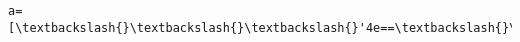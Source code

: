 \documentclass[11pt]{article}
\begin{document}
\begin{Verbatim}[commandchars=\\\{\}]
a=[\textbackslash{}\textbackslash{}\textbackslash{}'4e==\textbackslash{}\textbackslash{}\textbackslash{}',\textbackslash{}\textbackslash{}\textbackslash{}'4d\textbackslash{}\textbackslash{}\textbackslash{}',\textbackslash{}\textbackslash{}\textbackslash{}'4c=\textbackslash{}\textbackslash{}\textbackslash{}',\textbackslash{}\textbackslash{}\textbackslash{}'4b\textbackslash{}\textbackslash{}\textbackslash{}',\textbackslash{}\textbackslash{}\textbackslash{}'4a\textbackslash{}\textbackslash{}\textbackslash{}',\textbackslash{}\textbackslash{}\textbackslash{}'49=\textbackslash{}\textbackslash{}\textbackslash{}',\textbackslash{}\textbackslash{}\textbackslash{}'48=\textbackslash{}\textbackslash{}\textbackslash{}',\textbackslash{}\textbackslash{}\textbackslash{}'4z=\textbackslash{}\textbackslash{}\textbackslash{}',\textbackslash{}\textbackslash{}\textbackslash{}'4l\textbackslash{}\textbackslash{}\textbackslash{}',\textbackslash{}\textbackslash{}\textbackslash{}'4A\textbackslash{}\textbackslash{}\textbackslash{}',\textbackslash{}\textbackslash{}\textbackslash{}'4R=\textbackslash{}\textbackslash{}\textbackslash{}',\textbackslash{}\textbackslash{}\textbackslash{}'55=\textbackslash{}\textbackslash{}\textbackslash{}',\textbackslash{}\textbackslash{}\textbackslash{}'54\textbackslash{}\textbackslash{}\textbackslash{}',\textbackslash{}\textbackslash{}\textbackslash{}'53\textbackslash{}\textbackslash{}\textbackslash{}',\textbackslash{}\textbackslash{}\textbackslash{}'52=\textbackslash{}\textbackslash{}\textbackslash{}',\textbackslash{}\textbackslash{}\textbackslash{}'51\textbackslash{}\textbackslash{}\textbackslash{}',\textbackslash{}\textbackslash{}\textbackslash{}'4Z=\textbackslash{}\textbackslash{}\textbackslash{}',\textbackslash{}\textbackslash{}\textbackslash{}'4Y=\textbackslash{}\textbackslash{}\textbackslash{}',\textbackslash{}\textbackslash{}\textbackslash{}'4X=\textbackslash{}\textbackslash{}\textbackslash{}',\textbackslash{}\textbackslash{}\textbackslash{}'4W=\textbackslash{}\textbackslash{}\textbackslash{}',\textbackslash{}\textbackslash{}\textbackslash{}'4V=\textbackslash{}\textbackslash{}\textbackslash{}',\textbackslash{}\textbackslash{}\textbackslash{}'4U=\textbackslash{}\textbackslash{}\textbackslash{}',\textbackslash{}\textbackslash{}\textbackslash{}'4T==\textbackslash{}\textbackslash{}\textbackslash{}',\textbackslash{}\textbackslash{}\textbackslash{}'4S==\textbackslash{}\textbackslash{}\textbackslash{}',\textbackslash{}\textbackslash{}\textbackslash{}'4Q==\textbackslash{}\textbackslash{}\textbackslash{}',\textbackslash{}\textbackslash{}\textbackslash{}'4C==\textbackslash{}\textbackslash{}\textbackslash{}',\textbackslash{}\textbackslash{}\textbackslash{}'4P=\textbackslash{}\textbackslash{}\textbackslash{}',\textbackslash{}\textbackslash{}\textbackslash{}'4O\textbackslash{}\textbackslash{}\textbackslash{}',\textbackslash{}\textbackslash{}\textbackslash{}'4N\textbackslash{}\textbackslash{}\textbackslash{}',\textbackslash{}\textbackslash{}\textbackslash{}'4M\textbackslash{}\textbackslash{}\textbackslash{}',\textbackslash{}\textbackslash{}\textbackslash{}'4L\textbackslash{}\textbackslash{}\textbackslash{}',\textbackslash{}\textbackslash{}\textbackslash{}'4K\textbackslash{}\textbackslash{}\textbackslash{}',\textbackslash{}\textbackslash{}\textba
\end{Verbatim}
\end{document}
